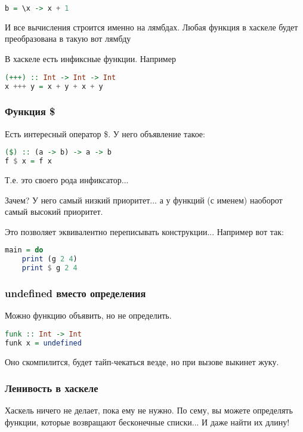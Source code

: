 \documentclass[10pt, a4paper]{article}
\begin{document}
\begin{lstlisting}[language=haskell]
b = \x -> x + 1
\end{lstlisting}

И все вычисления строится именно на лямбдах. Любая функция в хаскеле будет преобразована в такую вот лямбду

В хаскеле есть инфиксные функции. Например

\begin{lstlisting}[language=haskell]
(+++) :: Int -> Int -> Int
x +++ y = x + y + x + y
\end{lstlisting} 

\subsubsection{Функция \$}
Есть интересный оператор \$. У него объявление такое:

\begin{lstlisting}[language=haskell]
($) :: (a -> b) -> a -> b
f $ x = f x
\end{lstlisting}
 
Т.е. это своего рода инфиксатор...

Зачем? У него самый низкий приоритет... а у функций (с именем) наоборот самый высокий приоритет.

Это позволяет эквивалентно переписывать конструкции... Например вот так:
\begin{lstlisting}[language=haskell]
main = do 
    print (g 2 4)
    print $ g 2 4
\end{lstlisting}


\subsubsection{undefined вместо определения}

Можно функцию объявить, но не определить.
\begin{lstlisting}[language=haskell]
funk :: Int -> Int
funk x = undefined
\end{lstlisting}

Оно скомпилится, будет тайп-чекаться везде, но при вызове выкинет жуку.

\subsubsection{Ленивость в хаскеле}

Хаскель ничего не делает, пока ему не нужно. По сему, вы можете определять функции, которые возвращают бесконечные списки... И даже найти их длину!
\end{document}
